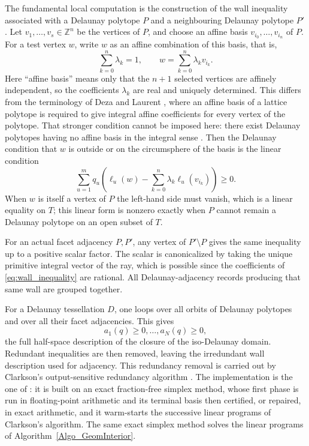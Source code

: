 \documentclass{amsart}
\newcommand{\ZZ}{\mathbb{Z}}
\begin{document}
The fundamental local computation is the construction of the wall inequality
associated with a Delaunay polytope \(P\) and a neighbouring Delaunay polytope
\(P'\).  Let \(v_1,\ldots,v_s\in\ZZ^n\) be the vertices of \(P\), and choose
an affine basis \(v_{i_0},\ldots,v_{i_n}\) of \(P\).  For a test vertex \(w\),
write \(w\) as an affine combination of this basis, that is,
\begin{equation}\label{eq:affine_combination}
  \sum_{k=0}^{n}\lambda_k = 1,\qquad
  w = \sum_{k=0}^{n}\lambda_k v_{i_k}.
\end{equation}
Here ``affine basis'' means only that the \(n+1\) selected vertices are
affinely independent, so the coefficients \(\lambda_k\) are real and uniquely
determined.  This differs from the terminology of Deza and Laurent
\cite{DezaLaurent1997}, where an affine basis of a lattice polytope is required
to give integral affine coefficients for every vertex of the polytope.  That
stronger condition cannot be imposed here: there exist Delaunay polytopes
having no affine basis in the integral sense
\cite{DutourSikiricGrishukhin2007}.
Then the Delaunay condition that \(w\) is outside or on the circumsphere of
the basis is the linear condition
\begin{equation}\label{eq:wall_inequality}
  \sum_{u=1}^{m} q_u
  \left(
    \ell_u(w) - \sum_{k=0}^{n}\lambda_k \ell_u(v_{i_k})
  \right) \geq 0 .
\end{equation}
When \(w\) is itself a vertex of \(P\) the left-hand side must vanish, which
is a linear equality on \(T\); this linear form is nonzero exactly when \(P\)
cannot remain a Delaunay polytope on an open subset of \(T\).

For an actual facet adjacency \(P,P'\), any vertex of \(P'\setminus P\) gives
the same inequality up to a positive scalar factor.  The scalar is
canonicalized by taking the unique primitive integral vector of the ray, which
is possible since the coefficients of \eqref{eq:wall_inequality} are rational.
All Delaunay-adjacency records producing that same wall are grouped together.

For a Delaunay tessellation \(D\), one loops over all orbits of Delaunay
polytopes and over all their facet adjacencies.  This gives
\begin{equation}
  a_1(q)\geq 0,\ldots,a_N(q)\geq 0,
\end{equation}
the full half-space description of the closure of the iso-Delaunay domain.
Redundant inequalities are then removed, leaving the irredundant wall
description used for adjacency.  This redundancy removal is carried out by
Clarkson's output-sensitive redundancy algorithm \cite{Clarkson1994}.  The
implementation is the one of \cite{DutourSikiricPolyhedralCommon}: it is built
on an exact fraction-free simplex method, whose first phase is run in
floating-point arithmetic and its terminal basis then certified, or repaired,
in exact arithmetic, and it warm-starts the successive linear programs of
Clarkson's algorithm.  The same exact simplex method solves the linear programs
of Algorithm~\ref{Algo_GeomInterior}.
\end{document}
